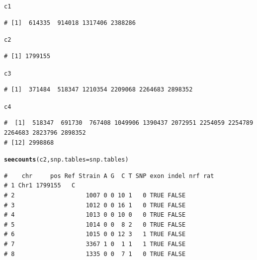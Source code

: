 \documentclass{article}\usepackage[]{graphicx}\usepackage[]{color}
\makeatletter
\newcommand{\hlstd}[1]{\textcolor[rgb]{0.345,0.345,0.345}{#1}}%
\newcommand{\hlkwc}[1]{\textcolor[rgb]{0.333,0.667,0.333}{#1}}%
\newcommand{\hlkwd}[1]{\textcolor[rgb]{0.737,0.353,0.396}{\textbf{#1}}}%
\newenvironment{kframe}{%
 \def\at@end@of@kframe{}%
 \ifinner\ifhmode%
  \def\at@end@of@kframe{\end{minipage}}%
  \begin{minipage}{\columnwidth}%
 \fi\fi%
 \def\FrameCommand##1{\hskip\@totalleftmargin \hskip-\fboxsep
 \colorbox{shadecolor}{##1}\hskip-\fboxsep
     \hskip-\linewidth \hskip-\@totalleftmargin \hskip\columnwidth}%
 \MakeFramed {\advance\hsize-\width
   \@totalleftmargin\z@ \linewidth\hsize
   \@setminipage}}%
 {\par\unskip\endMakeFramed%
 \at@end@of@kframe}
\newenvironment{knitrout}{}{} %
\makeatother
\begin{document}
\begin{knitrout}
\begin{kframe}
\begin{alltt}
\hlstd{c1}
\end{alltt}
\begin{verbatim}
# [1]  614335  914018 1317406 2388286
\end{verbatim}
\begin{alltt}
\hlstd{c2}
\end{alltt}
\begin{verbatim}
# [1] 1799155
\end{verbatim}
\begin{alltt}
\hlstd{c3}
\end{alltt}
\begin{verbatim}
# [1]  371484  518347 1210354 2209068 2264683 2898352
\end{verbatim}
\begin{alltt}
\hlstd{c4}
\end{alltt}
\begin{verbatim}
#  [1]  518347  691730  767408 1049906 1390437 2072951 2254059 2254789 2264683 2823796 2898352
# [12] 2998868
\end{verbatim}
\begin{alltt}
\hlkwd{seecounts}\hlstd{(c2,}\hlkwc{snp.tables}\hlstd{=snp.tables)}
\end{alltt}
\begin{verbatim}
#    chr     pos Ref Strain A G  C T SNP exon indel nrf rat
# 1 Chr1 1799155   C                                       
# 2                    1007 0 0 10 1   0 TRUE FALSE        
# 3                    1012 0 0 16 1   0 TRUE FALSE        
# 4                    1013 0 0 10 0   0 TRUE FALSE        
# 5                    1014 0 0  8 2   0 TRUE FALSE        
# 6                    1015 0 0 12 3   1 TRUE FALSE        
# 7                    3367 1 0  1 1   1 TRUE FALSE        
# 8                    1335 0 0  7 1   0 TRUE FALSE
\end{verbatim}
\end{kframe}
\end{knitrout}
\end{document}
